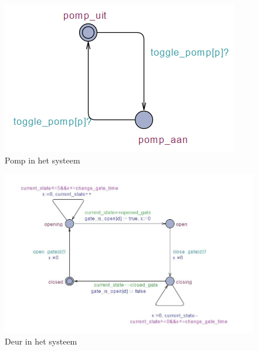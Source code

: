 \documentclass[oneside]{scrbook}
\begin{document}
    \begin{figure}[!h]
    \centering
    \includegraphics{Pomp.PNG}
    \caption{Pomp in het systeem}
    \label{fig:figure3}
    \end{figure}
    
    \begin{figure}[!h]
    \centering
    \includegraphics{Gate_final.JPG}
    \caption{Deur in het systeem}
    \label{fig:figure4}
    \end{figure}
    
\end{document}
